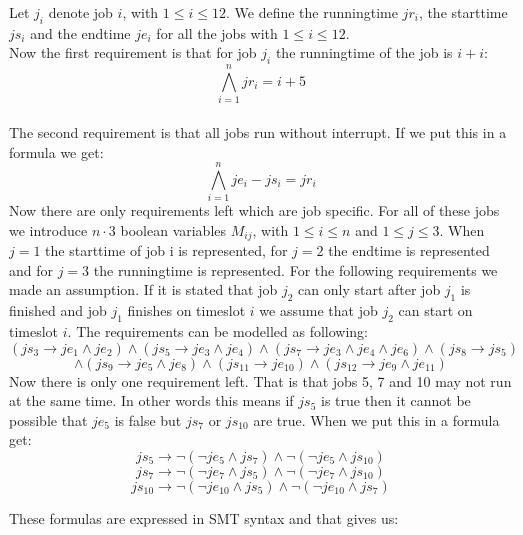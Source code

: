 \documentclass[12pt]{article}
\begin{document}
Let $j_i$ denote job $i$, with $1 \leq i \leq 12$. We define the runningtime $jr_i$, the starttime $js_i$ and the endtime $je_i$ for all the jobs with $1 \leq i \leq 12$.\\
Now the first requirement is that for job $j_i$ the runningtime of the job is $i+i$:
\[\bigwedge_{i=1}^{n} jr_i = i + 5\]\\
The second requirement is that all jobs run without interrupt. If we put this in a formula we get:
\[\bigwedge_{i=1}^{n} je_i - js_i = jr_i \]
Now there are only requirements left which are job specific. For all of these jobs we introduce $n \cdot 3$ boolean variables $M_{ij}$, with $1 \leq i \leq n$ and $1 \leq j \leq 3$. When $j =1$ the starttime of job i is represented, for $j=2$ the endtime is represented and for $j=3$ the runningtime is represented. For the following requirements we made an assumption. If it is stated that job $j_2$ can only start after job $j_1$ is finished and job $j_1$ finishes on timeslot $i$ we assume that job $j_2$ can start on timeslot $i$. The requirements can be modelled as following:\\
\[ (js_3 \rightarrow je_1 \wedge je_2) \wedge (js_5 \rightarrow je_3 \wedge je_4)  \wedge (js_7 \rightarrow je_3 \wedge je_4 \wedge je_6) \wedge (js_8 \rightarrow js_5) \]
\[ \wedge (js_9 \rightarrow je_5 \wedge je_8) \wedge (js_{11} \rightarrow je_{10})  \wedge (js_{12} \rightarrow je_9 \wedge je_{11}) \]
Now there is only one requirement left. That is that jobs 5, 7 and 10 may not run at the same time. In other words this means if $js_5$ is true then it cannot be possible that $je_5$ is false but $js_7$ or $js_{10}$ are true. When we put this in a formula get:
\[ js_5 \rightarrow  \neg(\neg je_5 \wedge js_7) \wedge\neg(\neg je_5 \wedge js_{10}) \]
\[ js_7 \rightarrow  \neg(\neg je_7 \wedge js_5) \wedge\neg(\neg je_7 \wedge js_{10}) \]
\[ js_{10} \rightarrow  \neg(\neg je_{10} \wedge js_5) \wedge\neg(\neg je_{10} \wedge js_{7}) \]

\noindent These formulas are expressed in SMT syntax and that gives us:
\end{document}
